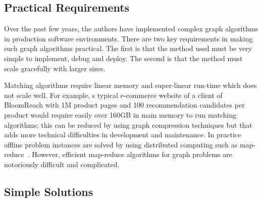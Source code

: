 \subsection{Practical Requirements}

Over the past few years, the authors have implemented complex graph algorithms in production software environments. 
There are two key requirements in making such graph algorithms
practical. The first is that the method used must be very simple to
implement, debug and deploy. The second is that the method must scale
gracefully with larger sizes. \vs

Matching algorithms require linear memory and super-linear run-time
which does not scale well. For example, s typical
e-commerce website of a client of BloomReach with 1M product pages and 100 recommendation candidates per
product would require easily over 160GB in main memory to run matching
algorithms; this can be reduced by using graph compression techniques but that adds more technical difficulties in development and maintenance. In practice offline problem instances are solved by using distributed computing such as map-reduce~\cite{DeanGhemawat2004}. However, efficient map-reduce algorithms for graph problems are notoriously difficult and complicated. \vs

\subsection{Simple Solutions}

